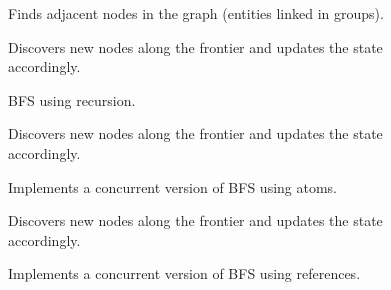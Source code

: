 \documentclass[12pt,letterpaper,oneside,notitlepage]{report}
\theoremstyle{definition}
\begin{document}
		\begin{figure}[ht!]
			
			\caption{Finds adjacent nodes in the graph (entities linked in groups).}
			\label{src:molly-algo-common-find-adj}
		\end{figure}
		
		\begin{figure}[ht!]
			
			\caption{Discovers new nodes along the frontier and updates the state accordingly.}
			\label{src:molly-algo-bfs-update-adj}
		\end{figure}
		
		\begin{figure}[ht!]
			
			\caption{BFS using recursion.}
			\label{src:molly-algo-bfs-bfs}
		\end{figure}
		
		\begin{figure}[ht!]
			
			\caption{Discovers new nodes along the frontier and updates the state accordingly.}
			\label{src:molly-algo-bfs-atom-update-adj}
		\end{figure}
		
		\begin{figure}[ht!]
			
			\caption{Implements a concurrent version of BFS using atoms.}
			\label{src:molly-algo-bfs-atom-bfs-atom}
		\end{figure}
		
		\begin{figure}[ht!]
			
			\caption{Discovers new nodes along the frontier and updates the state accordingly.}
			\label{src:molly-algo-bfs-ref-update-adj}
		\end{figure}
		
		\begin{figure}[ht!]
			
			\caption{Implements a concurrent version of BFS using references.}
			\label{src:molly-algo-bfs-ref-bfs-atom}
		\end{figure}
	
\end{document}
